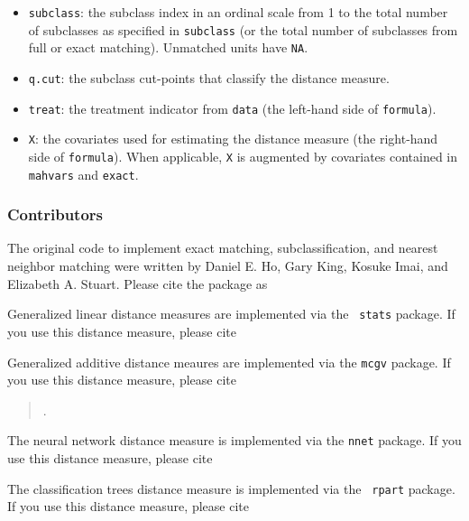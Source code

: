 \begin{itemize}
\item \texttt{subclass}: the subclass index in an ordinal
  scale from 1 to the total number of subclasses as specified in
  \texttt{subclass} (or the total number of subclasses from full or
  exact matching).  Unmatched units have \texttt{NA}.
  
\item \texttt{q.cut}: the subclass cut-points that classify the
  distance measure.
  
\item \texttt{treat}: the treatment indicator from \texttt{data}
  (the left-hand side of \texttt{formula}).
 
\item \texttt{X}: the covariates used for estimating the
  distance measure (the right-hand side of \texttt{formula}).  When
  applicable, \texttt{X} is augmented by covariates contained in
  \texttt{mahvars} and \texttt{exact}. 
\end{itemize}

\subsubsection{Contributors}

The original code to implement exact matching, subclassification, and
nearest neighbor matching were written by Daniel E. Ho, Gary King,
Kosuke Imai, and Elizabeth A. Stuart.  Please cite the \MatchIt
package as 
\begin{verse}
\end{verse}

Generalized linear distance measures are implemented via the {\tt
stats} package.  If you use this distance measure, please cite 
\begin{verse}
\end{verse}

Generalized additive distance meaures are implemented via the
{\tt mcgv} package.  If you use this distance measure, please cite
\begin{verse}
.
\end{verse}  

The neural network distance measure is implemented via the {\tt nnet}
package.  If you use this distance measure, please cite
\begin{verse}
\end{verse}

The classification trees distance measure is implemented via the {\tt
rpart} package.  If you use this distance measure, please cite 
\begin{verse}
\end{verse}  

